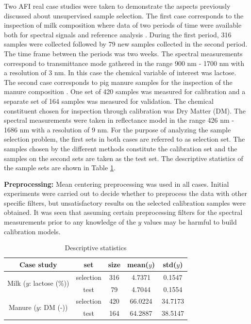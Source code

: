 \documentclass[journal=ancham,manuscript=article]{achemso}
\begin{document}
Two AFI real case studies were taken to demonstrate the aspects previously discussed about unsupervised sample selection. The first case corresponds to the inspection of milk composition where data of two periods of time were available both for spectral signals and reference analysis \cite{Diaz-Olivares2020}. During the first period, 316 samples were collected followed by 79 new samples collected in the second period. The time frame between the periods was two weeks. The spectral measurements correspond to transmittance mode gathered in the range 900 nm - 1700 nm with a resolution of 3 nm. In this case the chemical variable of interest was lactose. 
The second case corresponds to pig manure samples for the inspection of the manure composition \cite{Saeys2005}. One set of 420 samples was measured for calibration and a separate set of 164 samples was measured for validation. The chemical constituent chosen for inspection through calibration was Dry Matter (DM). The spectral measurements were taken in reflectance model in the range 426 nm - 1686 nm with a resolution of 9 nm.
For the purpose of analyzing the sample selection problem, the first sets in both cases are referred to as selection set. The samples chosen by the different methods constitute the calibration set and the samples on the second sets are taken as the test set. The descriptive statistics of the sample sets are shown in Table \ref{tab_descriptive_statistics}.

\textbf{Preprocessing:} Mean centering preprocessing was used in all cases. Initial experiments were carried out to decide whether to preprocess the data with other specific filters, but unsatisfactory results on the selected calibration samples were obtained. It was seen that assuming certain preprocessing filters for the spectral measurements prior to any knowledge of the $y$ values may be harmful to build calibration models. 

\begin{table}[t]
\centering
\begin{tabular}{|c|c|c|c|c|} 
\hline
Case study	& set & size & mean($y$) & std($y$)  	\\
\hline
\multirow{2}{10em}{Milk ($y$: lactose (\%))} & selection & 316 & 4.7371 & 0.1547\\
& test & 79 & 4.7044 & 0.1554\\
\hline
\multirow{2}{10em}{Manure ($y$: DM (-))} & selection & 420 & 66.0224 & 34.7173\\
& test & 164 & 64.2887 & 38.5147 \\
\hline 


\end{tabular}
\caption{Descriptive statistics}
\label{tab_descriptive_statistics}
\end{table}
\end{document}
